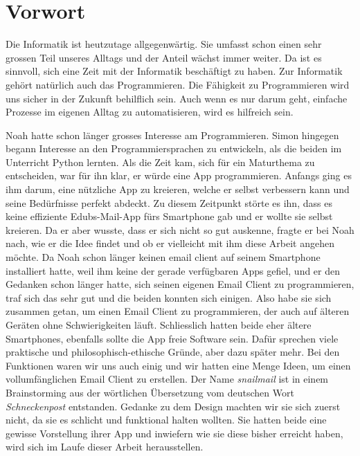 \documentclass[a4paper,11pt]{article}
\begin{document}
\tableofcontents
\pagebreak

\section{Vorwort}
Die Informatik ist heutzutage allgegenwärtig. Sie umfasst schon einen sehr grossen Teil unseres Alltags und der Anteil wächst immer weiter. Da ist es sinnvoll, sich 
eine Zeit mit der Informatik beschäftigt zu haben. Zur Informatik gehört natürlich auch das Programmieren. Die Fähigkeit zu Programmieren wird uns sicher in der
Zukunft behilflich sein. Auch wenn es nur darum geht, einfache Prozesse im eigenen Alltag zu automatisieren, wird es hilfreich sein. 

Noah hatte schon länger grosses Interesse am Programmieren. Simon hingegen begann Interesse an den Programmiersprachen zu entwickeln, als die beiden im Unterricht 
Python lernten. Als die Zeit kam, sich für ein Maturthema zu entscheiden, war für ihn klar, er würde eine App programmieren. Anfangs ging es ihm darum, eine 
nützliche App zu kreieren, welche er selbst verbessern kann und seine Bedürfnisse perfekt abdeckt.
Zu diesem Zeitpunkt störte es ihn, dass es keine effiziente Edubs-Mail-App fürs Smartphone gab und er wollte sie selbst kreieren. 
Da er aber wusste, dass er sich nicht so gut auskenne, fragte er bei Noah nach, wie er die Idee findet und ob er vielleicht mit ihm diese Arbeit 
angehen möchte.
Da Noah schon länger keinen \gls{email client} auf seinem Smartphone installiert hatte, weil ihm keine der gerade verfügbaren Apps gefiel, und er den Gedanken 
schon länger hatte, sich seinen eigenen Email Client zu programmieren, traf sich das sehr gut und die beiden konnten sich einigen. 
Also habe sie sich zusammen getan, um einen Email Client zu programmieren, der auch auf älteren Geräten ohne Schwierigkeiten läuft. Schliesslich hatten beide
eher ältere Smartphones, ebenfalls sollte die App \gls{freie Software} sein. 
Dafür sprechen viele praktische und philosophisch-ethische Gründe, aber dazu später mehr.
Bei den Funktionen waren wir uns auch einig und wir hatten eine Menge Ideen, um einen vollumfänglichen Email Client zu erstellen. Der Name \textit{snailmail} ist in einem 
Brainstorming aus der wörtlichen Übersetzung vom deutschen Wort \textit{Schneckenpost} entstanden. Gedanke zu dem Design machten wir sie sich zuerst nicht,
da sie es schlicht und funktional halten wollten. 
Sie hatten beide eine gewisse Vorstellung ihrer App und inwiefern wie sie diese bisher erreicht haben, wird sich im Laufe dieser Arbeit herausstellen. \\
\end{document}
